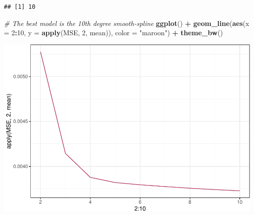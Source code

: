 \documentclass[]{article}
\newenvironment{Shaded}{\begin{snugshade}}{\end{snugshade}}
\newcommand{\KeywordTok}[1]{\textcolor[rgb]{0.13,0.29,0.53}{\textbf{#1}}}
\newcommand{\DataTypeTok}[1]{\textcolor[rgb]{0.13,0.29,0.53}{#1}}
\newcommand{\DecValTok}[1]{\textcolor[rgb]{0.00,0.00,0.81}{#1}}
\newcommand{\StringTok}[1]{\textcolor[rgb]{0.31,0.60,0.02}{#1}}
\newcommand{\CommentTok}[1]{\textcolor[rgb]{0.56,0.35,0.01}{\textit{#1}}}
\newcommand{\OperatorTok}[1]{\textcolor[rgb]{0.81,0.36,0.00}{\textbf{#1}}}
\newcommand{\NormalTok}[1]{#1}
\begin{document}
\begin{verbatim}
## [1] 10
\end{verbatim}

\begin{Shaded}
\begin{Highlighting}[]
\CommentTok{# The best model is the 10th degree smooth-spline}
\KeywordTok{ggplot}\NormalTok{() }\OperatorTok{+}\StringTok{ }\KeywordTok{geom_line}\NormalTok{(}\KeywordTok{aes}\NormalTok{(}\DataTypeTok{x =} \DecValTok{2}\OperatorTok{:}\DecValTok{10}\NormalTok{, }\DataTypeTok{y =} \KeywordTok{apply}\NormalTok{(MSE, }\DecValTok{2}\NormalTok{, mean)), }\DataTypeTok{color =} \StringTok{"maroon"}\NormalTok{) }\OperatorTok{+}\StringTok{ }\KeywordTok{theme_bw}\NormalTok{()}
\end{Highlighting}
\end{Shaded}

\includegraphics{hw7_files/figure-latex/unnamed-chunk-11-1.pdf}
\end{document}
